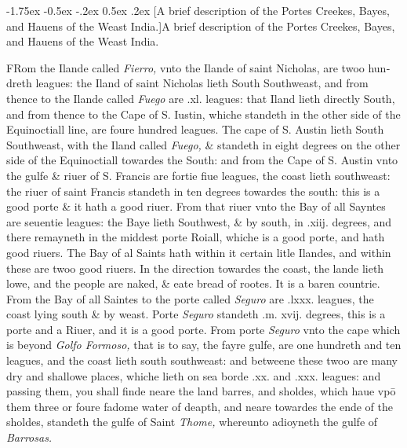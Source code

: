 \documentclass[11pt,twoside]{article}\makeatletter
\makeatletter
\renewcommand\section{\@startsection {section}{1}{\z@}%
     {-1.75ex \@plus -0.5ex \@minus -.2ex}%
     {0.5ex \@plus .2ex}%
     {\reset@font\Large\bfseries\sffamily}}
\makeatother
\begin{document}
\section[{A brief description of the Portes Creekes, Bayes, and Hauens of the Weast India.}]{A brief description of the Portes Creekes, Bayes, and Hauens of the Weast India.}\par
FRom the Ilande called {\itshape Fierro,} vnto the Ilande of saint Nicholas, are twoo hun­dreth leagues: the Iland of saint Nicholas lieth South Southweast, and from thence to the Ilande called {\itshape Fuego} are .xl. leagues: that Iland lieth directly South, and from thence to the Cape of S. Iustin, whiche standeth in the o­ther side of the Equinoctiall line, are foure hundred leagues. The cape of S. Austin lieth South Southweast, with the 
	\normalmarginpar
       Iland called {\itshape Fuego,} \& standeth in eight degrees on the other side of the Equinoctiall towardes the South: and from the Cape of S. Austin vnto the gulfe \& riuer of S. Francis are 
	\normalmarginpar
       fortie fiue leagues, the coast lieth southweast: the riuer of saint Francis standeth in ten degrees towardes the south: this is a good porte \& it hath a good riuer. From that riuer vnto the 
	\normalmarginpar
       Bay of all Sayntes are seuentie leagues: the Baye lieth Southwest, \& by south, in .xiij. degrees, and there remayneth in the middest porte Roiall, whiche is a good porte, and hath good riuers. The Bay of al Saints hath within it certain litle Ilandes, and within these are twoo good riuers. In the dire­ction towardes the coast, the lande lieth lowe, and the people are naked, \& eate bread of rootes. It is a baren countrie. From the Bay of all Saintes to the porte called {\itshape Seguro} are .lxxx. leagues, the coast lying south \& by weast. Porte {\itshape Seguro} stan­deth .m. xvij. degrees, this is a porte and a Riuer, and it is a good porte. From porte {\itshape Seguro} vnto the cape which is beyond {\itshape Golfo Formoso,} that is to say, the fayre gulfe, are one hundreth and ten leagues, and the coast lieth south southweast: and be­tweene these twoo are many dry and shallowe places, whiche %
 lieth on sea borde .xx. and .xxx. leagues: and passing them, you shall finde neare the land barres, and sholdes, which haue vpō them three or foure fadome water of deapth, and neare to­wardes the ende of the sholdes, standeth the gulfe of Saint {\itshape Thome,} whereunto adioyneth the gulfe of {\itshape Barrosas.} 
\end{document}
